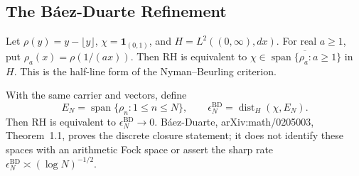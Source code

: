 \subsection{The B\'aez-Duarte Refinement}
\label{v4-arith:hpvbconv:baez-duarte}

\begin{theorem}
\label{v4-arith:hpvbconv:thm:nyman-beurling}
Let \(\rho(y)=y-\lfloor y\rfloor\), \(\chi=\mathbf1_{(0,1)}\),
and \(H=L^2((0,\infty),dx)\). For real \(a\ge1\), put
\(\rho_a(x)=\rho(1/(ax))\). Then RH is equivalent to
\(\chi\in\overline{\operatorname{span}\{\rho_a:a\ge1\}}\) in \(H\).
This is the half-line form of the Nyman--Beurling criterion.
\end{theorem}

\begin{theorem}
\label{v4-arith:hpvbconv:thm:baez-duarte}
With the same carrier and vectors, define
\[
 E_N=\operatorname{span}\{\rho_n:1\le n\le N\},\qquad
 \epsilon_N^{\mathrm{BD}}=\operatorname{dist}_H(\chi,E_N).
\]
Then RH is equivalent to \(\epsilon_N^{\mathrm{BD}}\to0\).
B\'aez-Duarte, arXiv:math/0205003, Theorem~1.1, proves the discrete
closure statement; it does not identify these spaces with an
arithmetic Fock space or assert the sharp rate
\(\epsilon_N^{\mathrm{BD}}\asymp(\log N)^{-1/2}\).
\end{theorem}

